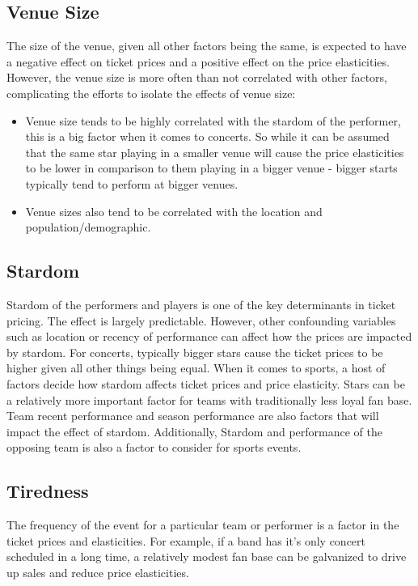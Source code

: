 \documentclass[letterpaper, 12pt]{article}
\begin{document}
\subsection{Venue Size}
The size of the venue, given all other factors being the same, is expected to have a negative effect on ticket prices and a positive effect on the price elasticities. However, the venue size is more often than not correlated with other factors, complicating the efforts to isolate the effects of venue size:
\begin{itemize}
	\item Venue size tends to be highly correlated with the stardom of the performer, this is a big factor when it comes to concerts. So while it can be assumed that the same star playing in a smaller venue will cause the price elasticities to be lower in comparison to them playing in a bigger venue - bigger starts typically tend to perform at bigger venues.
	\item Venue sizes also tend to be correlated with the location and population/demographic.
\end{itemize}

\subsection{Stardom}
Stardom of the performers and players is one of the key determinants in ticket pricing. The effect is largely predictable. However, other confounding variables such as location or recency of performance can affect how the prices are impacted by stardom. For concerts, typically bigger stars cause the ticket prices to be higher given all other things being equal. When it comes to sports, a host of factors decide how stardom affects ticket prices and price elasticity. Stars can be a relatively more important factor for teams with traditionally less loyal fan base. Team recent performance and season performance are also factors that will impact the effect of stardom. Additionally, Stardom and performance of the opposing team is also a factor to consider for sports events.

\subsection{Tiredness} The frequency of the event for a particular team or performer is a factor in the ticket prices and elasticities. For example, if a band has it's only concert scheduled in a long time, a relatively modest fan base can be galvanized to drive up sales and reduce price elasticities.
\end{document}
